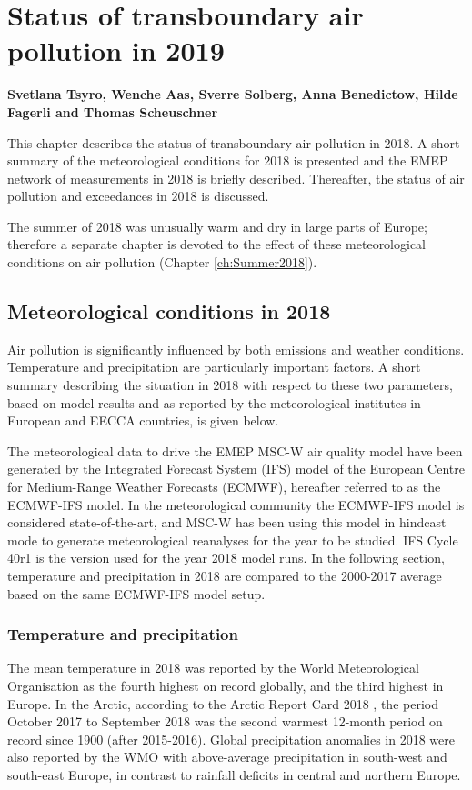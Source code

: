 \chapter[Status in 2019]{Status of transboundary air pollution in 2019}
\label{ch:chapterStatus}


{\bf{Svetlana Tsyro, Wenche Aas, Sverre Solberg, Anna Benedictow, Hilde Fagerli and Thomas Scheuschner}}
\vspace{30pt}

This chapter describes the status of transboundary air pollution in 2018. A short summary of the meteorological conditions for 2018 is presented and the EMEP network of measurements in 2018 is briefly described. Thereafter, the status of air pollution and exceedances in 2018 is discussed.

The summer of 2018 was unusually warm and dry in large parts of Europe; therefore a separate chapter is devoted to the effect of these meteorological conditions on air pollution (Chapter \ref{ch:Summer2018}).

\section{Meteorological conditions in 2018}
\label{sec:meteo}
Air pollution is significantly influenced by both emissions and weather conditions. Temperature and precipitation are particularly important factors. A short summary describing the situation in 2018 with respect to these two parameters, based on model results and as reported by the meteorological institutes in European and EECCA countries, is given below.

The meteorological data to drive the EMEP MSC-W air quality model have been generated by the Integrated Forecast System (IFS) model of the European Centre for Medium-Range Weather Forecasts (ECMWF), hereafter referred to as the ECMWF-IFS model. In the meteorological community the ECMWF-IFS model is considered state-of-the-art, and MSC-W has been using this model in hindcast mode to generate meteorological reanalyses for the year to be studied. IFS Cycle 40r1 is the version used for the year 2018 model runs. In the following section, temperature and precipitation in 2018 are compared to the 2000-2017 average based on the same ECMWF-IFS model setup.

\subsection{Temperature and precipitation}
The mean temperature in 2018 was reported by the World Meteorological Organisation \citep{WMO1233:2018} as the fourth highest on record globally, and the third highest in Europe. In the Arctic, according to the Arctic Report Card 2018 \citep{Overland:ARC2018}, the period October 2017 to September 2018 was the second warmest 12-month period on record since 1900 (after 2015-2016).
Global precipitation anomalies in 2018 were also reported by the WMO \citep{WMO1233:2018} with above-average precipitation in south-west and south-east Europe, in contrast to rainfall deficits in central and northern Europe. 

